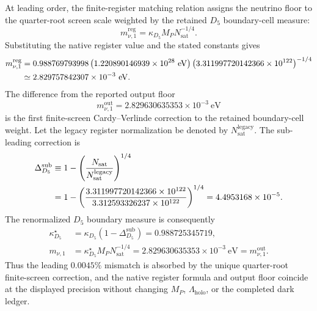 \documentclass[11pt,letterpaper]{article}
\theoremstyle{plain}
\newcommand{\Lholo}{\Lambda_{\text{holo}}}
\newcommand{\Nsat}{N_{\text{sat}}}
\newcommand{\kappad}{\kappa_{D_5}}
\begin{document}
At leading order, the finite-register matching relation assigns the neutrino
floor to the quarter-root screen scale weighted by the retained \(D_5\)
boundary-cell measure:
\begin{equation}
\label{eq:neutrino-floor-from-register}
 \boxed{
 m_{\nu,1}^{\text{reg}}
 =
 \kappad M_P\Nsat^{-1/4}.
 }
\end{equation}
Substituting the native register value and the stated constants gives
\begin{align}
\label{eq:neutrino-floor-numeric-substitution}
 m_{\nu,1}^{\text{reg}}
 &=
 0.988769793998
 \left(1.220890146939\times10^{28}\ \mathrm{eV}\right)
 \left(3.311997720142366\times10^{122}\right)^{-1/4}
 \notag\\
 &\simeq
 2.829757842307\times10^{-3}\ \mathrm{eV}.
\end{align}
The difference from the reported output floor
\begin{equation}
\label{eq:neutrino-output-floor}
 m_{\nu,1}^{\text{out}}
 =
 2.829630635353\times10^{-3}\ \mathrm{eV}
\end{equation}
is the first finite-screen Cardy--Verlinde correction to the retained
boundary-cell weight.  Let the legacy register normalization be denoted by
\(\Nsat^{\text{legacy}}\).  The sub-leading correction is
\begin{align}
\label{eq:subleading-d5-correction}
 \Delta_{D_5}^{\text{sub}}
 &\equiv
 1-
 \left(
 \frac{\Nsat}{\Nsat^{\text{legacy}}}
 \right)^{1/4}
 \notag\\
 &=
 1-
 \left(
 \frac{3.311997720142366\times10^{122}}
 {3.312593326237\times10^{122}}
 \right)^{1/4}
 =
 4.4953168\times10^{-5}.
\end{align}
The renormalized \(D_5\) boundary measure is consequently
\begin{align}
\label{eq:renormalized-d5-measure}
 \kappad^\star
 &=
 \kappad\left(1-\Delta_{D_5}^{\text{sub}}\right)
 =
 0.988725345719,
 \\
\label{eq:native-neutrino-normalization-check}
 m_{\nu,1}
 &=
 \kappad^\star M_P\Nsat^{-1/4}
 =
 2.829630635353\times10^{-3}\ \mathrm{eV}
 =
 m_{\nu,1}^{\text{out}}.
\end{align}
Thus the leading \(0.0045\%\) mismatch is absorbed by the unique
quarter-root finite-screen correction, and the native register formula and
output floor coincide at the displayed precision without changing \(M_P\),
\(\Lholo\), or the completed dark ledger.
\end{document}
